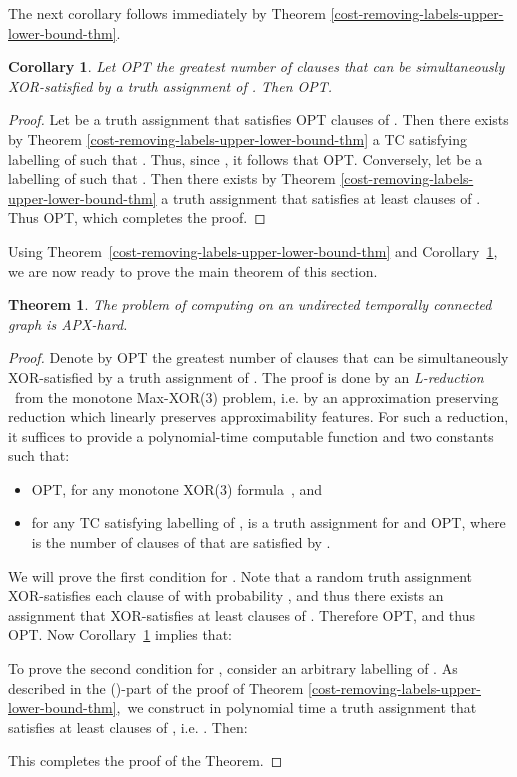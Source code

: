 \documentclass[a4paper,UKenglish]{article}
\newtheorem{theorem}{Theorem}
\newtheorem{corollary}{Corollary}
\begin{document}
The next corollary follows immediately by Theorem \ref {cost-removing-labels-upper-lower-bound-thm}.

\begin{corollary}
\label{cost-removing-labels-cor}Let OPT the
greatest number of clauses that can be simultaneously XOR-satisfied by a
truth assignment of . Then OPT.
\end{corollary}

\begin{proof}
Let  be a truth assignment that satisfies OPT clauses of . Then there exists by Theorem \ref {cost-removing-labels-upper-lower-bound-thm} a TC satisfying labelling  of  such that . Thus, since , it follows that OPT.
Conversely, let  be a labelling of  such
that . Then there exists by
Theorem \ref{cost-removing-labels-upper-lower-bound-thm} a truth assignment  that satisfies at least  clauses of . Thus OPT,
which completes the proof.
\end{proof}

Using Theorem~\ref{cost-removing-labels-upper-lower-bound-thm} and Corollary~\ref{cost-removing-labels-cor}, we are now
ready to prove the main theorem of this section.



\begin{theorem}
\label{cost-removing-labels-APX-hard-thm}The problem of computing  on an undirected temporally connected graph  is APX-hard.
\end{theorem}

\begin{proof}
Denote by OPT the greatest number of
clauses that can be simultaneously XOR-satisfied by a truth assignment of . The proof is done by an \emph{L-reduction} \cite{papadimitriou91}\
from the monotone Max-XOR(3) problem, i.e. by an approximation preserving
reduction which linearly preserves approximability features. For such a
reduction, it suffices to provide a polynomial-time computable function 
and two constants  such that:

\begin{itemize}
\item OPT, for any monotone XOR(3) formula~, and

\item for any TC satisfying labelling  of ,  is a
truth assignment for  and OPT,
where  is the number of clauses of  that are satisfied by .
\end{itemize}

We will prove the first condition for . Note that a random truth
assignment XOR-satisfies each clause of  with probability , and thus there exists an assignment  that XOR-satisfies at least  clauses of . Therefore OPT, and thus OPT. Now Corollary~\ref{cost-removing-labels-cor}
implies that:


To prove the second condition for , consider an arbitrary labelling 
 of . As described in the ()-part of the proof of Theorem \ref {cost-removing-labels-upper-lower-bound-thm},\ we construct in polynomial
time a truth assignment  that satisfies at least  clauses of , i.e. . Then:


This completes the proof of the Theorem. 
\end{proof}
\end{document}
